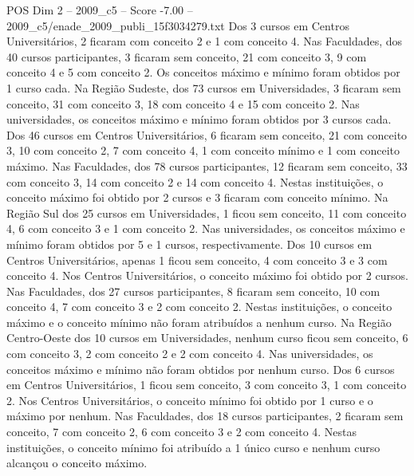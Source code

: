 \begin{textsample}{POS Dim 2 – 2009\_c5 – Score -7.00 – 2009\_c5/enade\_2009\_publi\_15f3034279.txt}
Dos 3 cursos em Centros Universitários, 2 ficaram com conceito 2 e 1 com conceito 4.
Nas Faculdades, dos 40 cursos participantes, 3 ficaram sem conceito, 21 com conceito 3, 9 com conceito 4 e 5 com conceito 2.
Os conceitos máximo e mínimo foram obtidos por 1 curso cada.
Na Região Sudeste, dos 73 cursos em Universidades, 3 ficaram sem conceito, 31 com conceito 3, 18 com conceito 4 e 15 com conceito 2.
Nas universidades, os conceitos máximo e mínimo foram obtidos por 3 cursos cada.
Dos 46 cursos em Centros Universitários, 6 ficaram sem conceito, 21 com conceito 3, 10 com conceito 2, 7 com conceito 4, 1 com conceito mínimo e 1 com conceito máximo.
Nas Faculdades, dos 78 cursos participantes, 12 ficaram sem conceito, 33 com conceito 3, 14 com conceito 2 e 14 com conceito 4.
Nestas instituições, o conceito máximo foi obtido por 2 cursos e 3 ficaram com conceito mínimo.
Na Região Sul dos 25 cursos em Universidades, 1 ficou sem conceito, 11 com conceito 4, 6 com conceito 3 e 1 com conceito 2.
Nas universidades, os conceitos máximo e mínimo foram obtidos por 5 e 1 cursos, respectivamente.
Dos 10 cursos em Centros Universitários, apenas 1 ficou sem conceito, 4 com conceito 3 e 3 com conceito 4.
Nos Centros Universitários, o conceito máximo foi obtido por 2 cursos.
Nas Faculdades, dos 27 cursos participantes, 8 ficaram sem conceito, 10 com conceito 4, 7 com conceito 3 e 2 com conceito 2.
Nestas instituições, o conceito máximo e o conceito mínimo não foram atribuídos a nenhum curso.
Na Região Centro-Oeste dos 10 cursos em Universidades, nenhum curso ficou sem conceito, 6 com conceito 3, 2 com conceito 2 e 2 com conceito 4.
Nas universidades, os conceitos máximo e mínimo não foram obtidos por nenhum curso.
Dos 6 cursos em Centros Universitários, 1 ficou sem conceito, 3 com conceito 3, 1 com conceito 2.
Nos Centros Universitários, o conceito mínimo foi obtido por 1 curso e o máximo por nenhum.
Nas Faculdades, dos 18 cursos participantes, 2 ficaram sem conceito, 7 com conceito 2, 6 com conceito 3 e 2 com conceito 4.
Nestas instituições, o conceito mínimo foi atribuído a 1 único curso e nenhum curso alcançou o conceito máximo.

\end{textsample}
